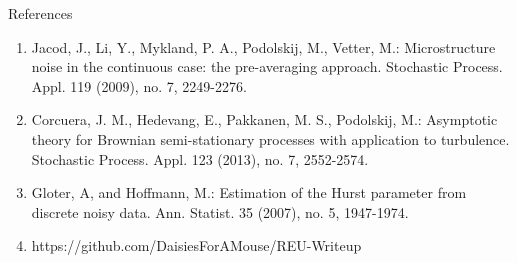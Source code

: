 \documentclass[final,hyperref={pdfpagelabels=false}]{beamer}
\begin{document}
\begin{frame}{}
\begin{columns}[t]
\begin{column}{0.28\linewidth}
        \begin{block}{References}
          {\footnotesize
          \begin{enumerate}
            \item Jacod, J., Li, Y., Mykland, P. A., Podolskij, M., Vetter, M.: Microstructure noise in the continuous case: the pre-averaging approach. Stochastic Process. Appl. 119 (2009), no. 7, 2249-2276.
            \item Corcuera, J. M., Hedevang, E., Pakkanen, M. S., Podolskij, M.: Asymptotic theory for Brownian semi-stationary processes with application to turbulence. Stochastic Process. Appl. 123 (2013), no. 7, 2552-2574.
            \item Gloter, A, and Hoffmann, M.: Estimation of the Hurst parameter from discrete noisy data. Ann. Statist. 35 (2007), no. 5, 1947-1974.
            \item https://github.com/DaisiesForAMouse/REU-Writeup
          \end{enumerate}
        }
        \end{block}

      \end{column}
    \end{columns}
  \end{frame}
\end{document}

